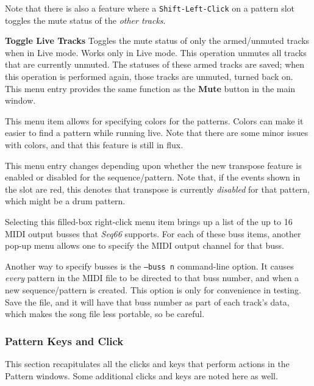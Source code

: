    Note that there is also a feature where a
   \texttt{Shift-Left-Click} on a pattern slot toggles the mute
   status of the \textsl{other tracks}.

   \textbf{Toggle Live Tracks}
   Toggles the mute status of only the armed/unmuted tracks when in Live mode.
   Works only in Live mode.  This operation unmutes all tracks that are
   currently unmuted.  The statuses of these armed tracks are saved; when
   this operation is performed again, those tracks are unmuted, turned back on.
   This menu entry provides the same function as the \textbf{Mute}
   button in the main window.

   This menu item allows for specifying colors for the patterns.
   Colors can make it easier to find a pattern while running live.
   Note that there are some minor issues with colors, and that this feature is
   still in flux.

   This menu entry changes depending upon whether the new transpose feature is
   enabled or disabled for the sequence/pattern.  Note that, if the events
   shown in the slot are red, this denotes that transpose is currently
   \textsl{disabled} for that pattern, which might be a drum pattern.

   Selecting this filled-box right-click menu item brings up a list
   of the up to 16 MIDI output busses that \textsl{Seq66} supports.
   For each of these buss items, another pop-up menu allows one
   to specify the MIDI output channel for that buss.

   Another way to specify busses is the
   \texttt{--buss n} command-line option.
   It causes \textsl{every} pattern in the MIDI
   file to be directed to that buss number, and when a new
   sequence/pattern is created.  This option is only
   for convenience in testing.  Save the file, and it will
   have that buss number as part of each track's data, which makes the song
   file less portable, so be careful.

\subsubsection{Pattern Keys and Click}
\label{subsubsec:patterns_pattern_keys_and_clicks}

   This section recapitulates all the clicks and keys that perform actions
   in the Pattern windows.  Some additional clicks and keys are noted here
   as well.

